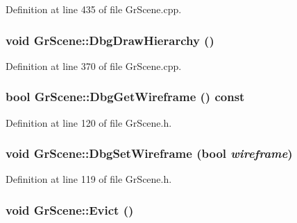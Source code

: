 Definition at line 435 of file GrScene.cpp.\hypertarget{class_gr_scene_a48f857953dfa7af6103b4a9bf6ee7c6}{
\subsubsection[{DbgDrawHierarchy}]{\setlength{\rightskip}{0pt plus 5cm}void GrScene::DbgDrawHierarchy ()}}
\label{class_gr_scene_a48f857953dfa7af6103b4a9bf6ee7c6}




Definition at line 370 of file GrScene.cpp.\hypertarget{class_gr_scene_1115b4bd5df43fe6c184aeea371bb3c4}{
\subsubsection[{DbgGetWireframe}]{\setlength{\rightskip}{0pt plus 5cm}bool GrScene::DbgGetWireframe () const}}
\label{class_gr_scene_1115b4bd5df43fe6c184aeea371bb3c4}




Definition at line 120 of file GrScene.h.\hypertarget{class_gr_scene_4221a4094e3df2199d1192b84d57f741}{
\subsubsection[{DbgSetWireframe}]{\setlength{\rightskip}{0pt plus 5cm}void GrScene::DbgSetWireframe (bool {\em wireframe})}}
\label{class_gr_scene_4221a4094e3df2199d1192b84d57f741}




Definition at line 119 of file GrScene.h.\hypertarget{class_gr_scene_cb24d3dbe6ccb8f318934a381d440541}{
\subsubsection[{Evict}]{\setlength{\rightskip}{0pt plus 5cm}void GrScene::Evict ()}}
\label{class_gr_scene_cb24d3dbe6ccb8f318934a381d440541}





